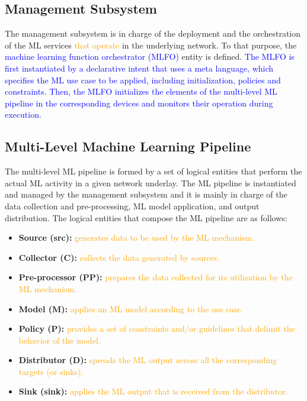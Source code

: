 \documentclass[journal]{IEEEtran}
\begin{document}
\subsection{Management Subsystem} 
The management subsystem is in charge of the deployment and the orchestration of the ML services \textcolor{orange}{that operate} in the underlying network. To that purpose, the \textcolor{blue}{machine learning function orchestrator (MLFO)} entity is defined. \textcolor{blue}{The MLFO is first instantiated by a declarative intent that uses a meta language, which specifies the ML use case to be applied, including initialization, policies and constraints. Then, the MLFO initializes the elements of the multi-level ML pipeline in the corresponding devices and monitors their operation during execution.}

\subsection{Multi-Level Machine Learning Pipeline} 
The multi-level ML pipeline is formed by a set of logical entities that perform the actual ML activity in a given network underlay. The ML pipeline is instantiated and managed by the management subsystem and it is mainly in charge of the data collection and pre-processing, ML model application, and output distribution. The logical entities that compose the ML pipeline are as follows:
\begin{itemize}
	\item \textbf{Source (src):} \textcolor{orange}{generates data to be used by the ML mechanism.}
	\item \textbf{Collector (C):} \textcolor{orange}{collects the data generated by sources.}
	\item \textbf{Pre-processor (PP):} \textcolor{orange}{prepares the data collected for its utilization by the ML mechanism.}
	\item \textbf{Model (M):} \textcolor{orange}{applies an ML model according to the use case.}
	\item \textbf{Policy (P):} \textcolor{orange}{provides a set of constraints and/or guidelines that delimit the behavior of the model.}
	\item \textbf{Distributor (D):} \textcolor{orange}{spreads the ML output across all the corresponding targets (or sinks).}
	\item \textbf{Sink (sink):} \textcolor{orange}{applies the ML output that is received from the distributor.}
\end{itemize}
\end{document}
